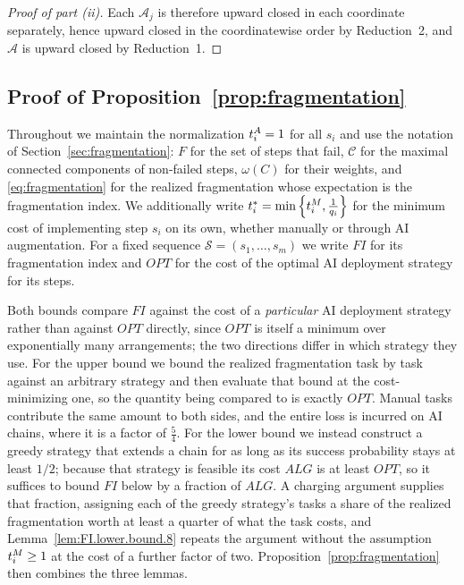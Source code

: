 \begin{proof}[Proof of part (ii)]
Each $\mathcal{A}_j$ is therefore upward closed in each coordinate separately, hence upward closed in the coordinatewise order by Reduction~2, and $\mathcal{A}$ is upward closed by Reduction~1.
\end{proof}

\subsection{Proof of Proposition~\ref{prop:fragmentation}}
\label{app:fragmentation_proof}

Throughout we maintain the normalization $t^{A}_{i} = 1$ for all $s_i$ and use the notation of Section~\ref{sec:fragmentation}: $F$ for the set of steps that fail, $\mathcal{C}$ for the maximal connected components of non-failed steps, $\omega(C)$ for their weights, and \eqref{eq:fragmentation} for the realized fragmentation whose expectation is the fragmentation index.
We additionally write $t^*_{i} = \min\left\{t^{M}_{i}, \frac{1}{q_i}\right\}$ for the minimum cost of implementing step $s_i$ on its own, whether manually or through AI augmentation.
For a fixed sequence $\mathcal{S} = (s_1, \dotsc, s_m)$ we write $FI$ for its fragmentation index and $OPT$ for the cost of the optimal AI deployment strategy for its steps.

Both bounds compare $FI$ against the cost of a \emph{particular} AI deployment strategy rather than against $OPT$ directly, since $OPT$ is itself a minimum over exponentially many arrangements; the two directions differ in which strategy they use.
For the upper bound we bound the realized fragmentation task by task against an arbitrary strategy and then evaluate that bound at the cost-minimizing one, so the quantity being compared to is exactly $OPT$.
Manual tasks contribute the same amount to both sides, and the entire loss is incurred on AI chains, where it is a factor of $\tfrac{5}{4}$.
For the lower bound we instead construct a greedy strategy that extends a chain for as long as its success probability stays at least $1/2$; because that strategy is feasible its cost $ALG$ is at least $OPT$, so it suffices to bound $FI$ below by a fraction of $ALG$.
A charging argument supplies that fraction, assigning each of the greedy strategy's tasks a share of the realized fragmentation worth at least a quarter of what the task costs, and Lemma~\ref{lem:FI.lower.bound.8} repeats the argument without the assumption $t^{M}_{i} \geq 1$ at the cost of a further factor of two.
Proposition~\ref{prop:fragmentation} then combines the three lemmas.


